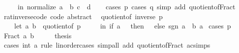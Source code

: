 \begin{isabellebody}
\ \ \ \ \ in\ normalize\ {\isacharparenleft}{\kern0pt}a\ {\isacharasterisk}{\kern0pt}\ b{\isacharcomma}{\kern0pt}\ c\ {\isacharasterisk}{\kern0pt}\ d{\isacharparenright}{\kern0pt}{\isacharparenright}{\kern0pt}{\isachardoublequoteclose}\isanewline
%
\isadelimproof
\ \ %
\endisadelimproof
%
\isatagproof
{}\isamarkupfalse%
\ {\isacharparenleft}{\kern0pt}cases\ p{\isacharcomma}{\kern0pt}\ cases\ q{\isacharparenright}{\kern0pt}\ {\isacharparenleft}{\kern0pt}simp\ add{\isacharcolon}{\kern0pt}\ quotient{\isacharunderscore}{\kern0pt}of{\isacharunderscore}{\kern0pt}Fract{\isacharparenright}{\kern0pt}%
\endisatagproof
{\isafoldproof}%
%
\isadelimproof
\isanewline
%
\endisadelimproof
\isanewline
{}\isamarkupfalse%
\ rat{\isacharunderscore}{\kern0pt}inverse{\isacharunderscore}{\kern0pt}code\ {\isacharbrackleft}{\kern0pt}code\ abstract{\isacharbrackright}{\kern0pt}{\isacharcolon}{\kern0pt}\isanewline
\ \ {\isachardoublequoteopen}quotient{\isacharunderscore}{\kern0pt}of\ {\isacharparenleft}{\kern0pt}inverse\ p{\isacharparenright}{\kern0pt}\ {\isacharequal}{\kern0pt}\isanewline
\ \ \ \ {\isacharparenleft}{\kern0pt}let\ {\isacharparenleft}{\kern0pt}a{\isacharcomma}{\kern0pt}\ b{\isacharparenright}{\kern0pt}\ {\isacharequal}{\kern0pt}\ quotient{\isacharunderscore}{\kern0pt}of\ p\isanewline
\ \ \ \ \ in\ if\ a\ {\isacharequal}{\kern0pt}\ {}\ then\ {\isacharparenleft}{\kern0pt}{}{\isacharcomma}{\kern0pt}\ {}{\isacharparenright}{\kern0pt}\ else\ {\isacharparenleft}{\kern0pt}sgn\ a\ {\isacharasterisk}{\kern0pt}\ b{\isacharcomma}{\kern0pt}\ {\isasymbar}a{\isasymbar}{\isacharparenright}{\kern0pt}{\isacharparenright}{\kern0pt}{\isachardoublequoteclose}\isanewline
%
\isadelimproof
%
\endisadelimproof
%
\isatagproof
{}\isamarkupfalse%
\ {\isacharparenleft}{\kern0pt}cases\ p{\isacharparenright}{\kern0pt}\isanewline
\ \ \isamarkupfalse%
\ {\isacharparenleft}{\kern0pt}Fract\ a\ b{\isacharparenright}{\kern0pt}\isanewline
\ \ \isamarkupfalse%
\ \isamarkupfalse%
\ {\isacharquery}{\kern0pt}thesis\isanewline
\ \ \ \ \isamarkupfalse%
\ {\isacharparenleft}{\kern0pt}cases\ {\isachardoublequoteopen}{}{\isacharcolon}{\kern0pt}{\isacharcolon}{\kern0pt}int{\isachardoublequoteclose}\ a\ rule{\isacharcolon}{\kern0pt}\ linorder{\isacharunderscore}{\kern0pt}cases{\isacharparenright}{\kern0pt}\ {\isacharparenleft}{\kern0pt}simp{\isacharunderscore}{\kern0pt}all\ add{\isacharcolon}{\kern0pt}\ quotient{\isacharunderscore}{\kern0pt}of{\isacharunderscore}{\kern0pt}Fract\ ac{\isacharunderscore}{\kern0pt}simps{\isacharparenright}{\kern0pt}\isanewline

\end{isabellebody}

